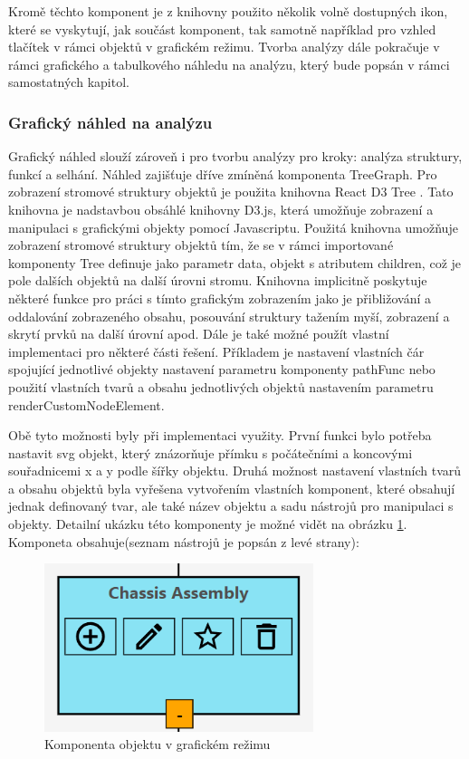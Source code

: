 Kromě těchto komponent je z knihovny použito několik volně dostupných ikon, které se vyskytují, jak součást komponent, tak samotně například pro vzhled tlačítek v rámci objektů v grafickém režimu. Tvorba analýzy dále pokračuje v rámci grafického a tabulkového náhledu na analýzu, který bude popsán v rámci samostatných kapitol.  

\subsubsection{Grafický náhled na analýzu}
\label{sec:grafika}
Grafický náhled slouží zároveň i pro tvorbu analýzy pro kroky: analýza struktury, funkcí a selhání. Náhled zajišťuje dříve zmíněná komponenta TreeGraph. Pro zobrazení stromové struktury objektů je použita knihovna React D3 Tree \cite{d3tree}. Tato knihovna je nadstavbou obsáhlé knihovny D3.js, která umožňuje zobrazení a manipulaci s grafickými objekty pomocí Javascriptu. Použitá knihovna umožňuje zobrazení stromové struktury objektů tím, že se v rámci importované komponenty Tree definuje jako parametr data, objekt s atributem children, což je pole dalších objektů na další úrovni stromu. Knihovna implicitně poskytuje některé funkce pro práci s tímto grafickým zobrazením jako je přibližování a oddalování zobrazeného obsahu, posouvání struktury tažením myší, zobrazení a skrytí prvků na další úrovní apod. Dále je také možné použít vlastní implementaci pro některé části řešení. Příkladem je nastavení vlastních čár spojující jednotlivé objekty nastavení parametru komponenty pathFunc nebo použití vlastních tvarů a obsahu jednotlivých objektů nastavením parametru renderCustomNodeElement.

Obě tyto možnosti byly při implementaci využity. První funkci bylo potřeba nastavit svg objekt, který znázorňuje přímku s počátečními a koncovými souřadnicemi x a y podle šířky objektu. Druhá možnost nastavení vlastních tvarů a obsahu objektů byla vyřešena vytvořením vlastních komponent, které obsahují jednak definovaný tvar, ale také název objektu a sadu nástrojů pro manipulaci s objekty. Detailní ukázku této komponenty je možné vidět na obrázku \ref{fig:node}. Komponeta obsahuje(seznam nástrojů je popsán z levé strany): 


\begin{figure}[h]
\centering
	\includegraphics[width=0.7\textwidth]{Figures/node.png}
	\caption{Komponenta objektu v grafickém režimu}
	\label{fig:node}
\end{figure}


